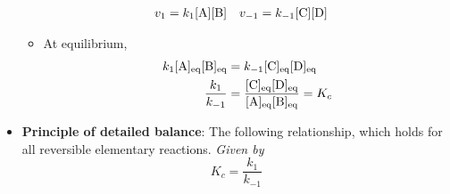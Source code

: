 \documentclass[../notes.tex]{subfiles}
\begin{document}
\begin{itemize}
\begin{itemize}
        \begin{align*}
            v_1 &= k_1[\ce{A}][\ce{B}]&
            v_{-1} &= k_{-1}[\ce{C}][\ce{D}]
        \end{align*}
        \item At equilibrium,
        \begin{align*}
            k_1[\ce{A}]_\text{eq}[\ce{B}]_\text{eq} &= k_{-1}[\ce{C}]_\text{eq}[\ce{D}]_\text{eq}\\
            \frac{k_1}{k_{-1}} &= \frac{[\ce{C}]_\text{eq}[\ce{D}]_\text{eq}}{[\ce{A}]_\text{eq}[\ce{B}]_\text{eq}} = K_c
        \end{align*}
    \end{itemize}
    \item \textbf{Principle of detailed balance}: The following relationship, which holds for all reversible elementary reactions. \emph{Given by}
    \begin{equation*}
        K_c = \frac{k_1}{k_{-1}}
    \end{equation*}
\end{itemize}
\end{document}
